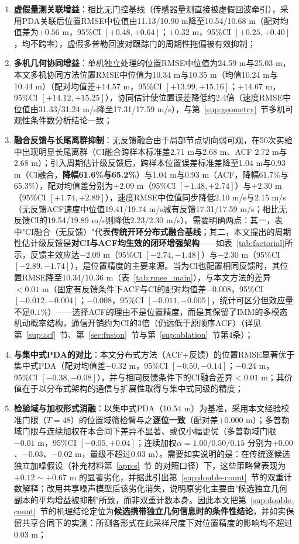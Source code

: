 \documentclass[UTF8,a4paper,zihao=-4]{ctexart}
\begin{document}
\begin{enumerate}
\item \textbf{虚假量测关联增益}：相比无门控基线（传感器量测直接被虚假回波牵引），采用PDA关联后位置RMSE中位值由11.13/10.90 m降至10.54/10.68 m（配对均值差为$+0.56$ m，95\%CI $[+0.48,+0.64]$；$+0.32$ m，95\%CI $[+0.25,+0.40]$，均不跨零），虚假多普勒回波对跟踪门的周期性拖偏被有效抑制；
\item \textbf{多机几何协同增益}：单机独立处理的位置RMSE中位值为24.59 m与25.03 m，本文多机协同方法位置RMSE中位值为10.34 m与10.35 m（均值10.24 m与10.44 m）（配对均值差$+14.57$ m，95\%CI $[+13.99,+15.16]$；$+14.67$ m，95\%CI $[+14.12,+15.25]$），协同估计使位置误差降低约2.4倍（速度RMSE中位值由31.33/31.24 m/s降至17.31/17.59 m/s），与第~\ref{sup:geometry}~节多机可观性条件数分析结论一致；
\item \textbf{融合反馈与长尾离群抑制}：无反馈融合由于局部节点切向弱可观，在50次实验中出现明显长尾离群（CI融合跨样本标准差2.71 m与2.68 m、ACF 2.72 m与2.68 m）；引入周期估计级反馈后，跨样本位置误差标准差降至1.04 m与0.93 m（CI融合，\textbf{降幅61.6\%与65.2\%}）与1.04 m与0.93 m（ACF，降幅61.7\%与65.3\%），配对均值差分别为$+2.09$ m（95\%CI $[+1.48,+2.74]$）与$+2.30$ m（95\%CI $[+1.74,+2.89]$），速度RMSE中位值同步降低2.10 m/s与2.15 m/s（无反馈ACF速度中位值19.41/19.74 m/s减有反馈17.31/17.59 m/s；相比无反馈CI的19.54/19.89 m/s则降低2.23/2.30 m/s）。需要明确两点：其一，表中"CI融合（无反馈）"代表\textbf{传统开环分布式融合基线}；其二，本文提出的周期性估计级反馈是\textbf{对CI与ACF均生效的闭环增强架构}——如表~\ref{tab:factorial}所示，反馈主效应达$-2.09$ m（95\%CI $[-2.74,-1.48]$）与$-2.30$ m（95\%CI $[-2.89,-1.74]$），是位置精度的主要来源。当为CI也配置相同反馈时，其位置RMSE降至10.34/10.36 m（表~\ref{tab:rmse_main}），与本文方法的差异$<0.01$ m（固定有反馈条件下ACF与CI的配对均值差$-0.008$，95\%CI $[-0.012,-0.004]$；$-0.008$，95\%CI $[-0.011,-0.005]$，统计可区分但效应量不足$0.1\%$）——选择ACF的理由不是位置精度，而是其保留了IMM的多模态机动概率结构，通信开销约为CI的3倍（仍远低于原顺序ACF）（详见第~\ref{sup:acf}~节、第~\ref{sec:fusion}~节与第~\ref{sup:ablation}~节第4条）；
\item \textbf{与集中式PDA的对比}：本文分布式方法（ACF+反馈）的位置RMSE显著优于集中式PDA（配对均值差$-0.32$ m，95\%CI $[-0.50,-0.14]$；$-0.24$ m，95\%CI $[-0.38,-0.08]$），并与相同反馈条件下的CI融合差异$<0.01$ m；其价值在于以分布式架构的通信与扩展性取得与集中式同级的精度；
\item \textbf{检验域与加权形式消融}：以集中式PDA（10.54 m）为基准，采用本文经验校准门限（$T=48$）的位置域筛检臂与之\textbf{逐位一致}（配对差$+0.000$ m）；多普勒域门限与连续加权在本合同下差异不显著、或仅小幅更优（多普勒域门限$-0.01$ m，95\%CI $[-0.05,+0.04]$；连续加权$\alpha=1.00/0.50/0.15$ 分别为$+0.00$、$-0.03$、$-0.02$ m，量级不超过0.03 m）。需要如实说明的是：在传统逐候选独立加噪假设（补充材料第~\ref{app:s}~节 的对照口径）下，这些策略曾表现为$+0.12\sim+0.67$ m 的显著劣化，并据此引出第~\ref{sup:double-count}~节的双重计数解释；改用共享噪声模型后该劣化消失，说明原劣化主要由"候选独立几何副本的平均增益被抑制"所致，而非双重计数本身。因此本文把第~\ref{sup:double-count}~节的机理结论定位为\textbf{候选携带独立几何信息时的条件性结论}，并如实保留共享合同下的实测：所测各形式在此采样尺度下对位置精度的影响均不超过0.03 m；

\end{enumerate}
\end{document}
